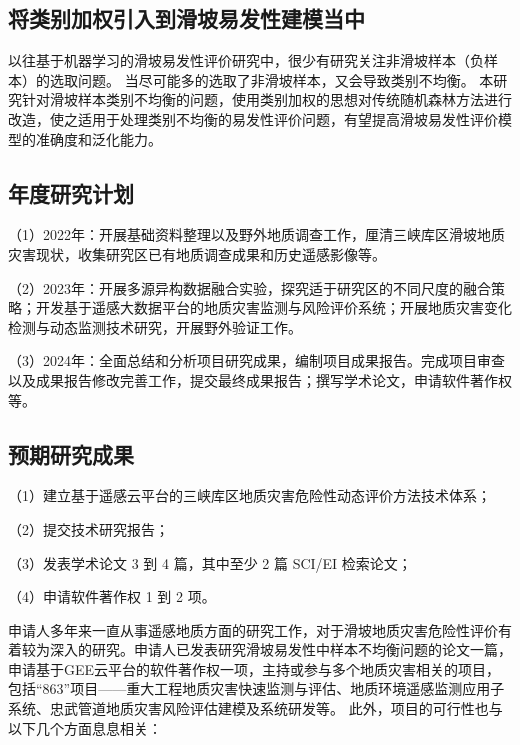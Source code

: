 \documentclass[a4paper,zihao=-4]{article}
\begin{document}
\subsection{将类别加权引入到滑坡易发性建模当中}

以往基于机器学习的滑坡易发性评价研究中，很少有研究关注非滑坡样本（负样本）的选取问题。
当尽可能多的选取了非滑坡样本，又会导致类别不均衡。
本研究针对滑坡样本类别不均衡的问题，使用类别加权的思想对传统随机森林方法进行改造，使之适用于处理类别不均衡的易发性评价问题，有望提高滑坡易发性评价模型的准确度和泛化能力。


\subsection{年度研究计划}

（1）2022年：开展基础资料整理以及野外地质调查工作，厘清三峡库区滑坡地质灾害现状，收集研究区已有地质调查成果和历史遥感影像等。

（2）2023年：开展多源异构数据融合实验，探究适于研究区的不同尺度的融合策略；开发基于遥感大数据平台的地质灾害监测与风险评价系统；开展地质灾害变化检测与动态监测技术研究，开展野外验证工作。

（3）2024年：全面总结和分析项目研究成果，编制项目成果报告。完成项目审查以及成果报告修改完善工作，提交最终成果报告；撰写学术论文，申请软件著作权等。

\subsection{预期研究成果}

（1）建立基于遥感云平台的三峡库区地质灾害危险性动态评价方法技术体系； 

（2）提交技术研究报告； 

（3）发表学术论文 3 到 4 篇，其中至少 2 篇 SCI/EI 检索论文； 

（4）申请软件著作权 1 到 2 项。



申请人多年来一直从事遥感地质方面的研究工作，对于滑坡地质灾害危险性评价有着较为深入的研究。申请人已发表研究滑坡易发性中样本不均衡问题的论文一篇，申请基于GEE云平台的软件著作权一项，主持或参与多个地质灾害相关的项目，包括“863”项目——重大工程地质灾害快速监测与评估、地质环境遥感监测应用子系统、忠武管道地质灾害风险评估建模及系统研发等。
此外，项目的可行性也与以下几个方面息息相关：
\end{document}
